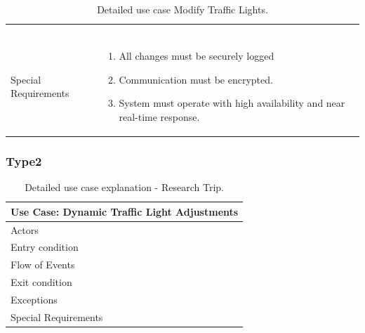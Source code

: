 \documentclass[11.5pt]{article}
\begin{document}
\begin{table}[!htp]
\begin{tabular}{@{} l p{23em} @{}}
\begin{enumerate}[left=0pt, parsep=0pt, topsep=0pt]
            \end{enumerate} \\
            Special Requirements                                                             & \begin{enumerate}[left=0pt, parsep=0pt, topsep=0pt]
            \item All changes must be securely logged
            \item Communication must be encrypted.
            \item System must operate with high availability and near real-time response.
            \end{enumerate} \\
            \bottomrule
        \end{tabular}
        \caption{Detailed use case Modify Traffic Lights.}
        \label{Use Case - Research Trip}
    \end{table}
    \subsubsection{Type2}
    \begin{table}[!htp]
        \centering
        \begin{tabular}{@{} l p{23em} @{}}
            \toprule \multicolumn{2}{c}{Use Case: \textbf{Dynamic Traffic Light Adjustments}} \\
            \midrule                                                                          %
            Actors                                                                           &  \\
            Entry condition                                                                  &  \\
            Flow of Events                                                                   &  \\
            Exit condition                                                                   &  \\
            Exceptions                                                                       &  \\
            Special Requirements                                                             &  \\
            \bottomrule
        \end{tabular}
        \caption{Detailed use case explanation - Research Trip.}
        \label{Use Case - Research Trip}
    \end{table}
\end{document}
